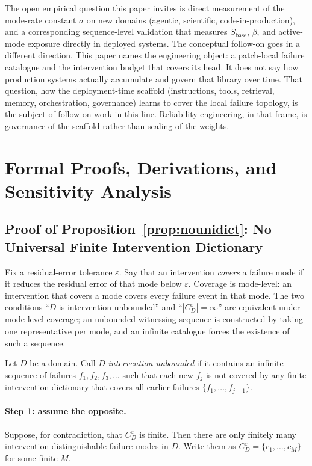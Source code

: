 \documentclass{article}
\theoremstyle{taeplain}
\theoremstyle{taedefn}
\begin{document}
The open empirical question this paper invites is direct measurement of the mode-rate constant $\sigma$ on new domains (agentic, scientific, code-in-production), and a corresponding sequence-level validation that measures $S_{\text{base}}$, $\beta$, and active-mode exposure directly in deployed systems. The conceptual follow-on goes in a different direction. This paper names the engineering object: a patch-local failure catalogue and the intervention budget that covers its head. It does not say how production systems actually accumulate and govern that library over time. That question, how the deployment-time scaffold (instructions, tools, retrieval, memory, orchestration, governance) learns to cover the local failure topology, is the subject of follow-on work in this line. Reliability engineering, in that frame, is governance of the scaffold rather than scaling of the weights.




\appendix

\section{Formal Proofs, Derivations, and Sensitivity Analysis}
\label{app:formal}

\subsection{Proof of Proposition~\ref{prop:nounidict}: No Universal Finite Intervention Dictionary}
\label{app:proof-nounidict}

Fix a residual-error tolerance $\varepsilon$. Say that an intervention \emph{covers} a failure mode if it reduces the residual error of that mode below $\varepsilon$. Coverage is mode-level: an intervention that covers a mode covers every failure event in that mode. The two conditions ``$D$ is intervention-unbounded'' and ``$|C_D^{\varepsilon}| = \infty$'' are equivalent under mode-level coverage; an unbounded witnessing sequence is constructed by taking one representative per mode, and an infinite catalogue forces the existence of such a sequence.

Let $D$ be a domain. Call $D$ \emph{intervention-unbounded} if it contains an infinite sequence of failures $f_1, f_2, f_3, \ldots$ such that each new $f_j$ is not covered by any finite intervention dictionary that covers all earlier failures $\{f_1, \ldots, f_{j-1}\}$.

\paragraph{Step 1: assume the opposite.}
Suppose, for contradiction, that $C_D^{\varepsilon}$ is finite. Then there are only finitely many intervention-distinguishable failure modes in $D$. Write them as $C_D^{\varepsilon} = \{c_1, \ldots, c_M\}$ for some finite $M$.
\end{document}
